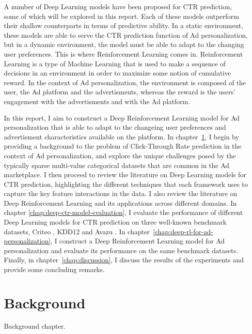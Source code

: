 \documentclass{mldsmsc}
\begin{document}
A number of Deep Learning models have been proposed for CTR prediction, some of which will be explored in this report. Each of these models
outperform their shallow counterparts in terms of predictive ability. In a static environment, these models are able to serve the CTR prediction
function of Ad personalization, but in a dynamic environment, the model must be able to adapt to the changing user preferences. This is where
Reinforcement Learning comes in. Reinforcement Learning is a type of Machine Learning that is used to make a sequence of decisions in an environment
in order to maximize some notion of cumulative reward. In the context of Ad personalization, the environment is composed of the user, the Ad platform
and the advertisments, whereas the reward is the users' engagement with the advertisments and with the Ad platform.

In this report, I aim to construct a Deep Reinforcement Learning model for Ad personalization that is able to adapt to the changeing user preferences
and advertisment characteristics available on the platform. In chapter~\ref{chap:background}, I begin by providing a background to the problem
of Click-Through Rate prediction in the context of Ad personalization, and explore the unique challenges posed by the typically sparse multi-value
categorical datasets that are common in the Ad marketplace. I then proceed to review the literature on Deep Learning models for CTR prediction, highlighting
the different techniques that each framework uses to capture the key feature interactions in the data. I also review the literature on Deep Reinforcement
Learning and its applications across different domains. In chapter \ref{chap:deep-ctr-model-evaluation}, I evaluate the performance of different
Deep Learning models for CTR prediction on three well-known benchmark datasets, Criteo \citep{RefWorks:tien2014display}, KDD12 \citep{RefWorks:aden2012kdd} 
and Avazu \citep{RefWorks:wang2014click-through}. In chapter~\ref{chap:deep-rl-for-ad-personalization}, I construct a Deep Reinforcement Learning model for Ad personalization and evaluate its performance
on the same benchmark datasets. Finally, in chapter~\ref{chap:discussion}, I discuss the results of the experiments and provide some concluding remarks.

\chapter{Background}
\label{chap:background}

Background chapter.
\end{document}
